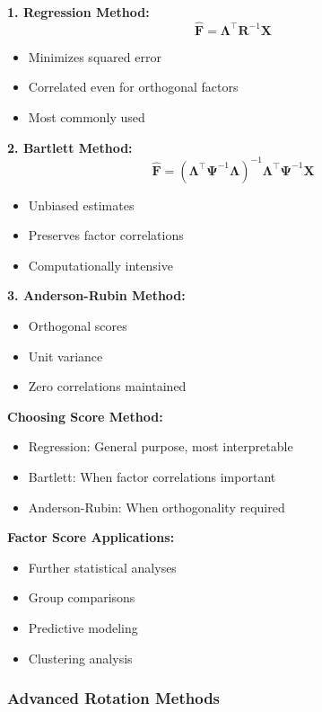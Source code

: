 \documentclass[
]{article}
\begin{document}
\textbf{1. Regression Method:}
\[\hat{\mathbf{F}} = \mathbf{\Lambda}^{\top}\mathbf{R}^{- 1}\mathbf{X}\]

\begin{itemize}
\item
  Minimizes squared error
\item
  Correlated even for orthogonal factors
\item
  Most commonly used
\end{itemize}

\textbf{2. Bartlett Method:}
\[\hat{\mathbf{F}} = \left( \mathbf{\Lambda}^{\top}\mathbf{\Psi}^{- 1}\mathbf{\Lambda} \right)^{- 1}\mathbf{\Lambda}^{\top}\mathbf{\Psi}^{- 1}\mathbf{X}\]

\begin{itemize}
\item
  Unbiased estimates
\item
  Preserves factor correlations
\item
  Computationally intensive
\end{itemize}

\textbf{3. Anderson-Rubin Method:}

\begin{itemize}
\item
  Orthogonal scores
\item
  Unit variance
\item
  Zero correlations maintained
\end{itemize}

\textbf{Choosing Score Method:}

\begin{itemize}
\item
  Regression: General purpose, most interpretable
\item
  Bartlett: When factor correlations important
\item
  Anderson-Rubin: When orthogonality required
\end{itemize}

\textbf{Factor Score Applications:}

\begin{itemize}
\item
  Further statistical analyses
\item
  Group comparisons
\item
  Predictive modeling
\item
  Clustering analysis
\end{itemize}

\subsubsection{Advanced Rotation Methods}
\end{document}
